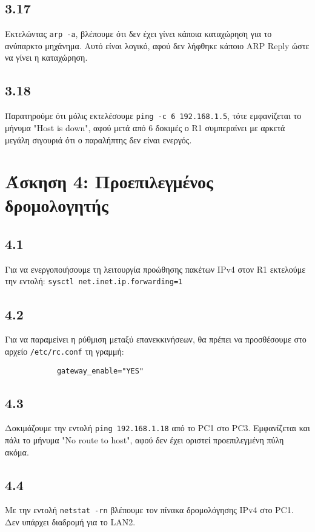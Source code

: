 \documentclass[a4paper, 12pt]{article}
\begin{document}
	\subsection*{3.17}
		Εκτελώντας \verb|arp -a|, βλέπουμε ότι δεν έχει γίνει κάποια καταχώρηση για το ανύπαρκτο μηχάνημα. Αυτό είναι λογικό, αφού δεν λήφθηκε κάποιο ARP Reply ώστε να γίνει η καταχώρηση.

	\subsection*{3.18}
		Παρατηρούμε ότι μόλις εκτελέσουμε \verb|ping -c 6 192.168.1.5|, τότε εμφανίζεται το μήνυμα "Host is down", αφού μετά από 6 δοκιμές ο R1 συμπεραίνει με αρκετά μεγάλη σιγουριά ότι ο παραλήπτης δεν είναι ενεργός. 

\section*{Άσκηση 4: Προεπιλεγμένος δρομολογητής}

	\subsection*{4.1}
		Για να ενεργοποιήσουμε τη λειτουργία προώθησης πακέτων IPv4 στον R1 εκτελούμε την εντολή: \verb|sysctl net.inet.ip.forwarding=1|

	\subsection*{4.2}
		Για να παραμείνει η ρύθμιση μεταξύ επανεκκινήσεων, θα πρέπει να προσθέσουμε στο αρχείο \verb|/etc/rc.conf| τη γραμμή: 
		
		\begin{verbatim}
			gateway_enable="YES"
		\end{verbatim}

	\subsection*{4.3}
		Δοκιμάζουμε την εντολή \verb|ping 192.168.1.18| από το PC1 στο PC3. Εμφανίζεται και πάλι το μήνυμα "No route to host", αφού δεν έχει οριστεί προεπιλεγμένη πύλη ακόμα.

	\subsection*{4.4}
		Με την εντολή \verb|netstat -rn| βλέπουμε τον πίνακα δρομολόγησης IPv4 στο PC1. Δεν υπάρχει διαδρομή για το LAN2.
\end{document}
